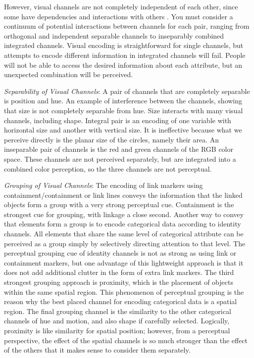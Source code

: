\documentclass[
]{book}
\begin{document}
However, visual channels are not completely independent of each other, since some have dependencies and interactions with others \citep{munzner2014visualization}. You must consider a continuum of potential interactions between channels for each pair, ranging from orthogonal and independent separable channels to inseparably combined integrated channels. Visual encoding is straightforward for single channels, but attempts to encode different information in integrated channels will fail. People will not be able to access the desired information about each attribute, but an unexpected combination will be perceived.

\emph{Separability of Visual Channels}: A pair of channels that are completely separable is position and hue.
An example of interference between the channels, showing that size is not completely separable from hue. Size interacts with many visual channels, including shape.
Integral pair is an encoding of one variable with horizontal size and another with vertical size. It is ineffective because what we perceive directly is the planar size of the circles, namely their area.
An inseparable pair of channels is the red and green channels of the RGB color space. These channels are not perceived separately, but are integrated into a combined color perception, so the three channels are not perceptual.

\emph{Grouping of Visual Channels}:
The encoding of link markers using containment/containment or link lines conveys the information that the linked objects form a group with a very strong perceptual cue. Containment is the strongest cue for grouping, with linkage a close second.
Another way to convey that elements form a group is to encode categorical data according to identity channels. All elements that share the same level of categorical attribute can be perceived as a group simply by selectively directing attention to that level. The perceptual grouping cue of identity channels is not as strong as using link or containment markers, but one advantage of this lightweight approach is that it does not add additional clutter in the form of extra link markers.
The third strongest grouping approach is proximity, which is the placement of objects within the same spatial region. This phenomenon of perceptual grouping is the reason why the best placed channel for encoding categorical data is a spatial region.
The final grouping channel is the similarity to the other categorical channels of hue and motion, and also shape if carefully selected. Logically, proximity is like similarity for spatial position; however, from a perceptual perspective, the effect of the spatial channels is so much stronger than the effect of the others that it makes sense to consider them separately.
\end{document}
